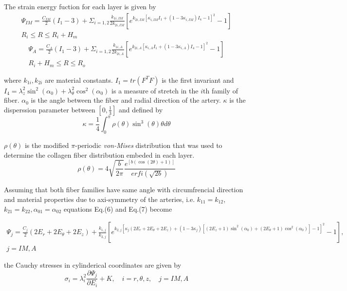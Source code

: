 \documentclass[review]{elsarticle}
\begin{document}
The strain energy fuction for each layer is given by %
\begin{multline} 
    \Psi_{IM}=\frac{C_{IM}}{2}(I_1-3)+\Sigma_{i=1,2} \frac{k_{1i,IM}}{2k_{2i,IM}}[e^{k_{2i,IM}[\kappa_{i,IM}I_1+(1-3\kappa_{i,IM})I_4-1]^2}-1] \\
     R_i \leq R \leq R_i+H_m 
\end{multline}
\begin{multline}
    \Psi_{A}=\frac{C_A}{2}(I_1-3)+\Sigma_{i=1,2} \frac{k_{1i,A}}{2k_{2i,A}}[e^{k_{2i,A}[\kappa_{i,A}I_1+(1-3\kappa_{i,A})I_4-1]^2}-1]\\
     R_i+H_m \leq R \leq R_o
\end{multline}

where $k_{1i},k_{2i}$ are material constants. $I_1=tr(F^TF)$ is the first invariant and
$I_4=\lambda_z^2\sin^2(\alpha_0)+\lambda_{\theta}^2 \cos^2(\alpha_0)$ is a measure of stretch in the $i$th family of fiber. $\alpha_0$ is the
angle between the fiber and radial direction of the artery. $\kappa$ is the disperssion parameter between $[0,\frac{1}{3}]$ and defined by
\begin{equation}
    \kappa=\frac{1}{4}\int_0^{\pi} \rho(\theta) \sin^3(\theta)\theta d\theta
\end{equation}

$\rho(\theta)$ is the modified $\pi$-periodic \emph{von-Mises} distribution that was used to determine the collagen fiber distribution 
embeded in each layer.
\begin{equation}
    \rho(\theta)=4\sqrt{\frac{b}{2\pi}}\frac{e^{[b(\cos(2\theta)+1)]}}{erfi(\sqrt{2b})}
\end{equation}

Assuming that both fiber families have same angle with circumfrencial direction and material properties due to axi-symmetry of the arteries, i.e. $k_{11}=k_{12}$,$k_{21}=k_{22},\alpha_{01}=\alpha_{02}$
equations Eq.(6) and Eq.(7) become

\begin{multline}
    \Psi_{j}=\frac{C_j}{2}(2E_{r}+2E_{\theta}+2E_z)+\frac{k_{1,j}}{k_{2,j}}[e^{k_{2,j}[\kappa_{j}(2E_{r}+2E_{\theta}+2E_z)+(1-3\kappa_{j})[(2E_z+1)\sin^2(\alpha_0)+(2E_{\theta}+1)\cos^2(\alpha_0)]-1]^2}-1], \\
    j=IM,A
\end{multline}

the Cauchy stresses in cylinderical coordinates are given by
\begin{equation}
    \sigma_i=\lambda_i^2 \frac{\partial \Psi_j}{\partial E_i}+ K, \quad
    i=r,\theta,z, \quad j=IM,A
\end{equation}
\end{document}

